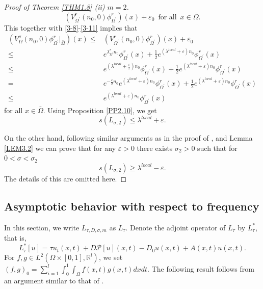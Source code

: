 \documentclass[11pt,reqno]{amsart}
\numberwithin{equation}{section}
\begin{document}
\begin{proof}[Proof of Theorem \ref{THM1.8} (ii) $\mathit{m = 2}$]
\begin{equation*}
(V^{r}_{\Omega^{\prime}}(n_{0},0)\phi^{r}_{\Omega^{\prime}})(x) +
\varepsilon_{0} \enspace\text{for all}\enspace x\in\bar\Omega.
\end{equation*}
%
This together with \eqref{3-8}-\eqref{3-11} implies that
\begin{align*}
(V^{\sigma}_{\Omega}(n_{0},0)\phi^{r}_{\Omega^{\prime}}|_{\bar{\Omega}})(x)
\leq&
(V^{r}_{\Omega^{\prime}}(n_{0},0)\phi^{r}_{\Omega^{\prime}})(x) +
\varepsilon_{0}
\\
\leq& e^{\lambda^{r}_{\Omega^{\prime}}n_{0}}\phi^{r}_{\Omega^{\prime}}(x) + \frac{1}{2} e^{(\lambda^{local} + \varepsilon)n_{0}}\phi^{r}_{\Omega^{\prime}}(x)
\\
\leq& e^{(\lambda^{local}+\frac{\varepsilon}{2})n_{0}}\phi^{r}_{\Omega^{\prime}}(x) + \frac{1}{2}e^{(\lambda^{local} + \varepsilon)n_{0}}\phi^{r}_{\Omega^{\prime}}(x)
\\
=& e^{-\frac{\varepsilon}{2}n_{0}}e^{(\lambda^{local} + \varepsilon)n_{0}}\phi^{r}_{\Omega^{\prime}}(x) + \frac{1}{2}e^{(\lambda^{local} + \varepsilon)n_{0}}\phi^{r}_{\Omega^{\prime}}(x)
\\
\leq& e^{(\lambda^{local} + \varepsilon)n_{0}}\phi^{r}_{\Omega^{\prime}}(x)
\end{align*}
for all $x\in\bar{\Omega}$. Using Proposition \ref{PP2.10}, we get
\begin{equation*}
s(L_{\sigma,2}) \leq \lambda^{local} + \varepsilon.
\end{equation*}


On the other hand, following similar arguments as in the proof of \cite[Theorem B]{SX}, and Lemma \ref{LEM3.2}
we can prove that for any $\varepsilon>0$ there exists $\sigma_{2}>0$ such that for $0<\sigma<\sigma_{2}$
\begin{equation*}
s(L_{\sigma,2}) \geq \lambda^{local} - \varepsilon.
\end{equation*}
The details of this are omitted here.
\end{proof}


\subsection{Asymptotic behavior with respect to frequency}
\indent

In this section, we write $L_{\tau,D,\sigma,m}$ as $L_{\tau}$.
Denote the adjoint operator of $L_{\tau}$ by $L^{*}_{\tau}$, that is,
\begin{equation*}
L^{*}_{\tau}[u] = \tau u_{t}(x,t) + D\mathcal{P}[u](x,t) - D_{0}u(x,t) + A(x,t)u(x,t).
\end{equation*}
For $f,g\in  L^{2}\left( \Omega\times[0,1], \mathbb{R}^{l}\right)$, we set
$(f,g)_{0} = \sum_{i=1}^{l} \int_{0}^{1}\int_{\Omega} f(x,t)g(x,t)dxdt.$
The following result follows from an argument similar to that of \cite[Lemma 3.1]{Feng}.
\end{document}
